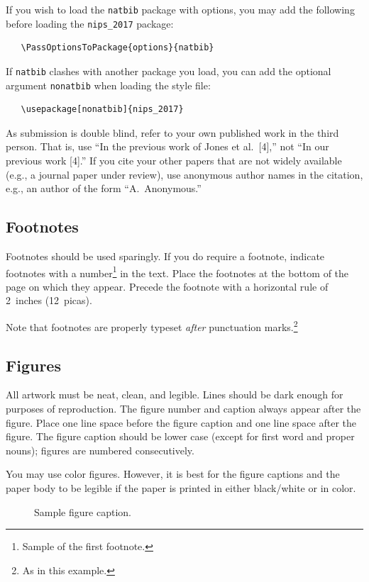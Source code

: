 \documentclass{article}
\begin{document}
If you wish to load the \verb+natbib+ package with options, you may
add the following before loading the \verb+nips_2017+ package:
\begin{verbatim}
   \PassOptionsToPackage{options}{natbib}
\end{verbatim}

If \verb+natbib+ clashes with another package you load, you can add
the optional argument \verb+nonatbib+ when loading the style file:
\begin{verbatim}
   \usepackage[nonatbib]{nips_2017}
\end{verbatim}

As submission is double blind, refer to your own published work in the
third person. That is, use ``In the previous work of Jones et
al.\ [4],'' not ``In our previous work [4].'' If you cite your other
papers that are not widely available (e.g., a journal paper under
review), use anonymous author names in the citation, e.g., an author
of the form ``A.\ Anonymous.''

\subsection{Footnotes}

Footnotes should be used sparingly.  If you do require a footnote,
indicate footnotes with a number\footnote{Sample of the first
  footnote.} in the text. Place the footnotes at the bottom of the
page on which they appear.  Precede the footnote with a horizontal
rule of 2~inches (12~picas).

Note that footnotes are properly typeset \emph{after} punctuation
marks.\footnote{As in this example.}

\subsection{Figures}

All artwork must be neat, clean, and legible. Lines should be dark
enough for purposes of reproduction. The figure number and caption
always appear after the figure. Place one line space before the figure
caption and one line space after the figure. The figure caption should
be lower case (except for first word and proper nouns); figures are
numbered consecutively.

You may use color figures.  However, it is best for the figure
captions and the paper body to be legible if the paper is printed in
either black/white or in color.
\begin{figure}[h]
  \centering
  \fbox{\rule[-.5cm]{0cm}{4cm} \rule[-.5cm]{4cm}{0cm}}
  \caption{Sample figure caption.}
\end{figure}
\end{document}
